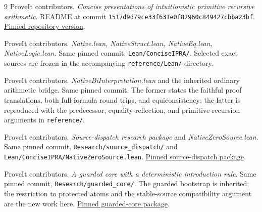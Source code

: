 \documentclass[11pt,letterpaper]{article}
\theoremstyle{definition}\newtheorem{definition}[theorem]{Definition}
\theoremstyle{remark}\newtheorem{remark}[theorem]{Remark}
\newcommand{\file}[1]{{\urlstyle{tt}\nolinkurl{#1}}}
\begin{document}
\begin{thebibliography}{9}
 ProveIt contributors.
\emph{Concise presentations of intuitionistic primitive recursive arithmetic}.
README at commit \file{1517d9d79ce33f631e0f82960c849427cbba23bf}.
\href{https://github.com/VladimirReshetnikov/ProveIt/tree/1517d9d79ce33f631e0f82960c849427cbba23bf/Logic/PrimitiveRecursiveArithmetic/ConciseIPRA}{Pinned repository version}.

 ProveIt contributors.
\emph{Native.lean, NativeStruct.lean, NativeEq.lean, NativeLogic.lean}.
Same pinned commit, \file{Lean/ConciseIPRA/}. Selected exact sources
are frozen in the accompanying \file{reference/Lean/} directory.

 ProveIt contributors.
\emph{NativeBiInterpretation.lean} and the inherited ordinary arithmetic
bridge. Same pinned commit. The former states the faithful proof
translations, both full formula round trips, and equiconsistency;
the latter is reproduced with the predecessor, equality-reflection,
and primitive-recursion arguments in \file{reference/}.

 ProveIt contributors.
\emph{Source-dispatch research package} and \emph{NativeZeroSource.lean}.
Same pinned commit, \file{Research/source_dispatch/} and
\file{Lean/ConciseIPRA/NativeZeroSource.lean}.
\href{https://github.com/VladimirReshetnikov/ProveIt/tree/1517d9d79ce33f631e0f82960c849427cbba23bf/Logic/PrimitiveRecursiveArithmetic/ConciseIPRA/Research/source_dispatch}{Pinned source-dispatch package}.

 ProveIt contributors.
\emph{A guarded core with a deterministic introduction rule}.
Same pinned commit, \file{Research/guarded_core/}. The guarded
bootstrap is inherited; the restriction to protected atoms and the
stable-source compatibility argument are the new work here.
\href{https://github.com/VladimirReshetnikov/ProveIt/tree/1517d9d79ce33f631e0f82960c849427cbba23bf/Logic/PrimitiveRecursiveArithmetic/ConciseIPRA/Research/guarded_core}{Pinned guarded-core package}.
\end{thebibliography}
\end{document}
